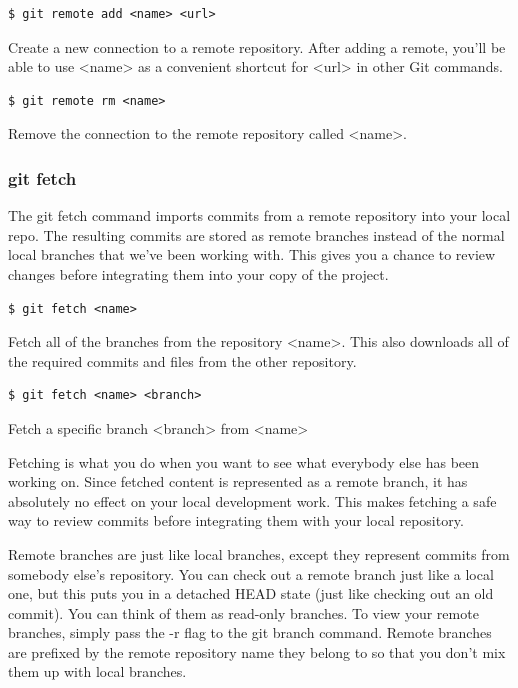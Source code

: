 \documentclass{article}
\begin{document}
\begin{lstlisting}
$ git remote add <name> <url>
\end{lstlisting}

Create a new connection to a remote repository. After adding a remote,
you'll be able to use <name> as a convenient shortcut for <url> in
other Git commands.

\begin{lstlisting}
$ git remote rm <name>
\end{lstlisting}

Remove the connection to the remote repository called <name>.

\subsubsection*{git fetch}

The git fetch command imports commits from a remote repository into
your local repo. The resulting commits are stored as remote branches
instead of the normal local branches that we've been working
with. This gives you a chance to review changes before integrating
them into your copy of the project.

\begin{lstlisting}
$ git fetch <name>
\end{lstlisting}

Fetch all of the branches from the repository <name>. This also downloads all
of the required commits and files from the other repository.

\begin{lstlisting}
$ git fetch <name> <branch>
\end{lstlisting}

Fetch a specific branch <branch> from <name>

Fetching is what you do when you want to see what everybody else has
been working on. Since fetched content is represented as a remote
branch, it has absolutely no effect on your local development
work. This makes fetching a safe way to review commits before
integrating them with your local repository.

Remote branches are just like local branches, except they represent
commits from somebody else's repository. You can check out a remote
branch just like a local one, but this puts you in a detached HEAD
state (just like checking out an old commit). You can think of them as
read-only branches. To view your remote branches, simply pass the -r
flag to the git branch command. Remote branches are prefixed by the
remote repository name they belong to so that you don't mix them up with local
branches.
\end{document}
